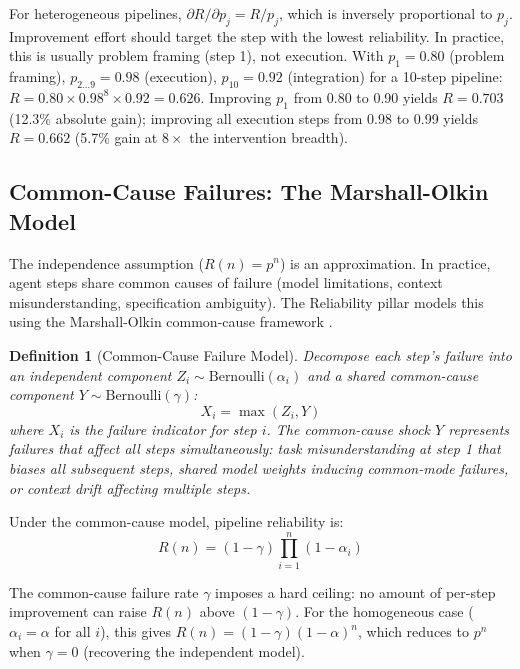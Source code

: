 \documentclass[11pt, a4paper]{googledeepmind}
\newtheorem{definition}{Definition}[section]
\begin{document}
For heterogeneous pipelines, $\partial R / \partial p_j = R / p_j$, which is inversely proportional to $p_j$. Improvement effort should target the step with the lowest reliability. In practice, this is usually problem framing (step 1), not execution. With $p_1 = 0.80$ (problem framing), $p_{2 \ldots 9} = 0.98$ (execution), $p_{10} = 0.92$ (integration) for a 10-step pipeline: $R = 0.80 \times 0.98^8 \times 0.92 = 0.626$. Improving $p_1$ from 0.80 to 0.90 yields $R = 0.703$ (12.3\% absolute gain); improving all execution steps from 0.98 to 0.99 yields $R = 0.662$ (5.7\% gain at $8\times$ the intervention breadth).

\subsection{Common-Cause Failures: The Marshall-Olkin Model}

The independence assumption ($R(n) = p^n$) is an approximation. In practice, agent steps share common causes of failure (model limitations, context misunderstanding, specification ambiguity). The Reliability pillar models this using the Marshall-Olkin common-cause framework \citep{marshall1967multivariate}.

\begin{definition}[Common-Cause Failure Model]
\label{def:common-cause}
Decompose each step's failure into an independent component $Z_i \sim \text{Bernoulli}(\alpha_i)$ and a shared common-cause component $Y \sim \text{Bernoulli}(\gamma)$:
\begin{equation}
    X_i = \max(Z_i, Y)
\end{equation}
where $X_i$ is the failure indicator for step $i$. The common-cause shock $Y$ represents failures that affect all steps simultaneously: task misunderstanding at step 1 that biases all subsequent steps, shared model weights inducing common-mode failures, or context drift affecting multiple steps.
\end{definition}

Under the common-cause model, pipeline reliability is:
\begin{equation}
    R(n) = (1 - \gamma) \prod_{i=1}^{n} (1 - \alpha_i)
\end{equation}

The common-cause failure rate $\gamma$ imposes a hard ceiling: no amount of per-step improvement can raise $R(n)$ above $(1 - \gamma)$. For the homogeneous case ($\alpha_i = \alpha$ for all $i$), this gives $R(n) = (1 - \gamma)(1 - \alpha)^n$, which reduces to $p^n$ when $\gamma = 0$ (recovering the independent model).
\end{document}

